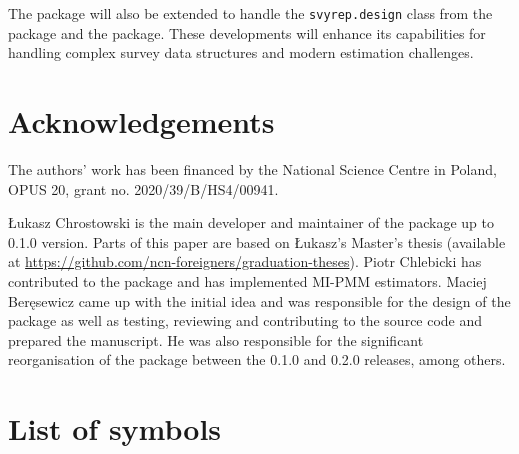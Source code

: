 \documentclass[
]{jss}
\begin{document}
The package will also be extended to handle the \texttt{svyrep.design}
class from the  package and the  package. These
developments will enhance its capabilities for handling complex survey
data structures and modern estimation challenges.

\section{Acknowledgements}\label{sec-acknowledgements}

The authors' work has been financed by the National Science Centre in
Poland, OPUS 20, grant no. 2020/39/B/HS4/00941.

Łukasz Chrostowski is the main developer and maintainer of the package
up to 0.1.0 version. Parts of this paper are based on Łukasz's Master's
thesis (available at
\url{https://github.com/ncn-foreigners/graduation-theses}). Piotr
Chlebicki has contributed to the package and has implemented MI-PMM
estimators. Maciej Beręsewicz came up with the initial idea and was
responsible for the design of the package as well as testing, reviewing
and contributing to the source code and prepared the manuscript. He was
also responsible for the significant reorganisation of the package
between the 0.1.0 and 0.2.0 releases, among others.

\appendix

\section{List of symbols}\label{list-of-symbols}
\end{document}
